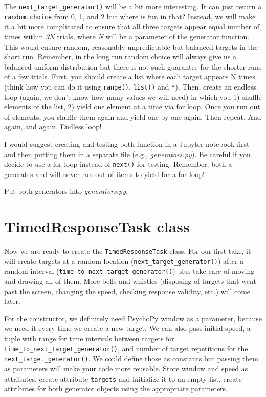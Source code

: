 \documentclass[
]{book}
\begin{document}
The \texttt{next\_target\_generator()} will be a bit more interesting. It can just return a \texttt{random.choice} from 0, 1, and 2 but where is fun in that? Instead, we will make it a bit more complicated to ensure that all three targets appear equal number of times within \emph{3N} trials, where \emph{N} will be a parameter of the generator function. This would ensure random, reasonably unpredictable but balanced targets in the short run. Remember, in the long run random choice will always give us a balanced uniform distribution but there is not such guarantee for the shorter runs of a few trials. First, you should create a list where each target appears N times (think how you can do it using \texttt{range()}, \texttt{list()} and \texttt{*}). Then, create an endless loop (again, we don't know how many values we will need) in which you 1) shuffle elements of the list, 2) yield one element at a time via for loop. Once you run out of elements, you shuffle them again and yield one by one again. Then repeat. And again, and again. Endless loop!

I would suggest creating and testing both function in a Jupyter notebook first and then putting them in a separate file (e.g., \emph{generators.py}). Be careful if you decide to use a for loop instead of \texttt{next()} for testing. Remember, both a generates and will never run out of items to yield for a for loop!

Put both generators into \emph{generators.py}.

\hypertarget{timedresponsetask-class}{%
\section{TimedResponseTask class}\label{timedresponsetask-class}}

Now we are ready to create the \texttt{TimedResponseTask} class. For our first take, it will create targets at a random location (\texttt{next\_target\_generator()}) after a random interval (\texttt{time\_to\_next\_target\_generator()}) plus take care of moving and drawing all of them. More bells and whistles (disposing of targets that went past the screen, changing the speed, checking response validity, etc.) will come later.

For the constructor, we definitely need PsychoPy window as a parameter, because we need it every time we create a new target. We can also pass initial speed, a tuple with range for time intervals between targets for \texttt{time\_to\_next\_target\_generator()}, and number of target repetitions for the \texttt{next\_target\_generator()}. We could define those as constants but passing them as parameters will make your code more reusable. Store window and speed as attributes, create attribute \texttt{targets} and initialize it to an empty list, create attributes for both generator objects using the appropriate parameters.
\end{document}
